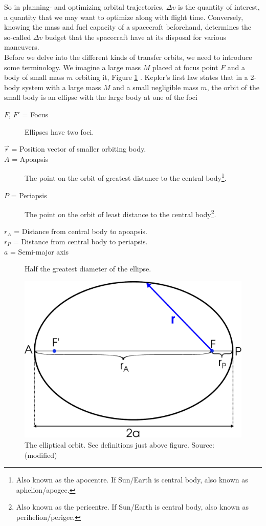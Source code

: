 So in planning- and optimizing orbital trajectories, $\Delta v$ is the quantity of interest, a quantity that we may want to optimize along with flight time. Conversely, knowing the mass and fuel capacity of a spacecraft beforehand, determines the so-called $\Delta v$ budget that the spacecraft have at its disposal for various maneuvers.
\\
Before we delve into the different kinds of transfer orbits, we need to introduce some terminology. We imagine a large mass $M$ placed at focus point $F$ and a body of small mass $m$ orbiting it, Figure \ref{fig:ellipse} \cite{Murray1999}. Kepler's first law states that in a 2-body system with a large mass $M$ and a small negligible mass $m$, the orbit of the small body is an ellipse with the large body at one of the foci \cite{Knudsen2002}
\begin{description}
    \item[$F$, $F'$ = Focus] Ellipses have two foci.
    \item[$\vec{r}$ = Position vector of smaller orbiting body.]
    \item[$A$ = Apoapsis] The point on the orbit of greatest distance to the central body\footnote{Also known as the apocentre. If Sun/Earth is central body, also known as aphelion/apogee.}.
    \item[$P$ = Periapsis] The point on the orbit of least distance to the central body\footnote{Also known as the pericentre. If Sun/Earth is central body, also known as perihelion/perigee.}.
    \item[$r_A$ = Distance from central body to apoapsis.]
    \item[$r_P$ = Distance from central body to periapsis.]
    \item[$a$ = Semi-major axis] Half the greatest diameter of the ellipse.
\end{description}

\begin{figure}[ht!]
\centering
\includegraphics[scale=0.51]{fig/ellipse.pdf}
\caption{The elliptical orbit. See definitions just above figure. Source: \cite{fig-ellipse} (modified)}
\label{fig:ellipse}
\end{figure}


